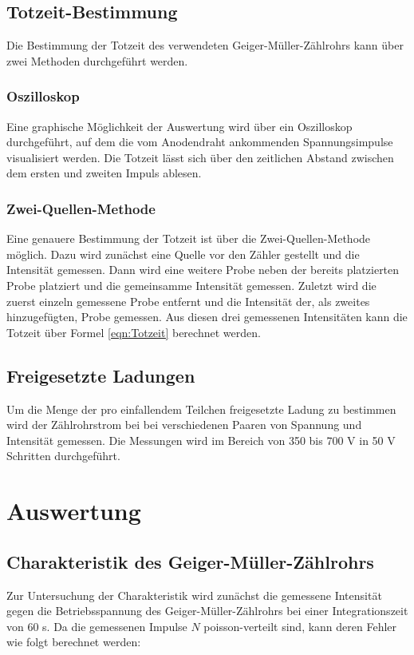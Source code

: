 \documentclass[titlepage = firstcover]{scrartcl}
\begin{document}
        \subsection{Totzeit-Bestimmung}
            Die Bestimmung der Totzeit des verwendeten Geiger-Müller-Zählrohrs kann über zwei Methoden durchgeführt werden.
            
            \subsubsection*{Oszilloskop}
                Eine graphische Möglichkeit der Auswertung wird über ein Oszilloskop durchgeführt, auf dem die vom Anodendraht ankommenden Spannungsimpulse visualisiert werden. Die Totzeit 
                lässt sich über den zeitlichen Abstand zwischen dem ersten und zweiten Impuls ablesen.
                
            \subsubsection*{Zwei-Quellen-Methode}
                Eine genauere Bestimmung der Totzeit ist über die Zwei-Quellen-Methode möglich. Dazu wird zunächst eine Quelle vor den Zähler gestellt und die Intensität gemessen. Dann wird eine
                weitere Probe neben der bereits platzierten Probe platziert und die gemeinsamme Intensität gemessen. Zuletzt wird die zuerst einzeln gemessene Probe entfernt und die Intensität
                der, als zweites hinzugefügten, Probe gemessen. Aus diesen drei gemessenen Intensitäten kann die Totzeit über Formel \ref{eqn:Totzeit} berechnet werden.
            
        
        \subsection{Freigesetzte Ladungen}
            Um die Menge der pro einfallendem Teilchen freigesetzte Ladung zu bestimmen wird der Zählrohrstrom bei bei verschiedenen Paaren von Spannung und Intensität gemessen. Die Messungen wird 
            im Bereich von 350 bis 700 V in 50 V Schritten durchgeführt.
            

    \section{Auswertung}
        \subsection{Charakteristik des Geiger-Müller-Zählrohrs}
                Zur Untersuchung der Charakteristik wird zunächst die gemessene Intensität gegen die Betriebsspannung des Geiger-Müller-Zählrohrs bei einer Integrationszeit von 60 s. Da die 
                gemessenen Impulse $N$ poisson-verteilt sind, kann deren Fehler wie folgt berechnet werden:
\end{document}

